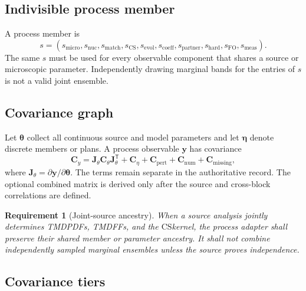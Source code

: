 \documentclass[11pt]{article}
\newtheorem{requirement}[definition]{Requirement}
\newcommand{\CS}{\ensuremath{\mathrm{CS}}}
\newcommand{\FO}{\ensuremath{\mathrm{FO}}}
\begin{document}
\subsection{Indivisible process member}

A process member is
\begin{equation}
 s
 =
 \left(
 s_{\mathrm{micro}},
 s_{\mathrm{nuc}},
 s_{\mathrm{match}},
 s_{\CS},
 s_{\mathrm{evol}},
 s_{\mathrm{coeff}},
 s_{\mathrm{partner}},
 s_{\mathrm{hard}},
 s_{\FO},
 s_{\mathrm{meas}}
 \right).
 \label{eq:process-member}
\end{equation}
The same \(s\) must be used for every observable component that shares a source or microscopic parameter.  Independently drawing marginal bands for the entries of \(s\) is not a valid joint ensemble.

\subsection{Covariance graph}

Let \(\bm\theta\) collect all continuous source and model parameters and let \(\bm\eta\) denote discrete members or plans.  A process observable \(\bm y\) has covariance
\begin{equation}
 \bm C_y
 =
 \bm J_\theta\bm C_\theta\bm J_\theta^{\mathsf T}
 +\bm C_{\eta}
 +\bm C_{\mathrm{pert}}
 +\bm C_{\mathrm{num}}
 +\bm C_{\mathrm{missing}},
 \label{eq:process-covariance}
\end{equation}
where \(\bm J_\theta=\partial\bm y/\partial\bm\theta\).  The terms remain separate in the authoritative record.  The optional combined matrix is derived only after the source and cross-block correlations are defined.

\begin{requirement}[Joint-source ancestry]
When a source analysis jointly determines TMDPDFs, TMDFFs, and the \CS kernel, the process adapter shall preserve their shared member or parameter ancestry.  It shall not combine independently sampled marginal ensembles unless the source proves independence.
\end{requirement}

\subsection{Covariance tiers}
\end{document}
